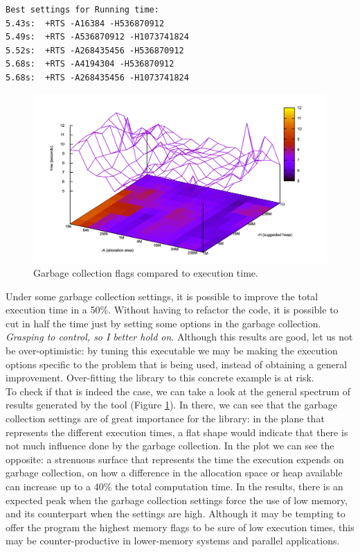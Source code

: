 \begin{lstlisting}
Best settings for Running time:
5.43s:  +RTS -A16384 -H536870912
5.49s:  +RTS -A536870912 -H1073741824
5.52s:  +RTS -A268435456 -H536870912
5.68s:  +RTS -A4194304 -H536870912
5.68s:  +RTS -A268435456 -H1073741824
\end{lstlisting}

\begin{figure}[ht]
\centering
\includegraphics[width=\textwidth]{img/gc-tuning.png}
\caption{Garbage collection flags compared to execution time.}
\label{gc-tuning}
\end{figure}

Under some garbage collection settings, it is possible to improve the total
execution time in a 50\%. Without having to refactor the code, it is possible
to cut in half the time just by setting some options in the garbage collection.
\emph{Grasping to control, so I better hold on}. Although this results are
good, let us not be over-optimistic: by tuning this executable we may be making
the execution options specific to the problem that is being used, instead of
obtaining a general improvement. Over-fitting the
library to this concrete example is at risk.\\

To check if that is indeed the case, we can take a look at the general spectrum
of results generated by the tool (Figure \ref{gc-tuning}). In there, we can see
that the garbage collection settings are of great importance for the library:
in the plane that represents the different execution times, a flat shape would
indicate that there is not much influence done by the garbage collection. In
the plot we can see the opposite: a strenuous surface that represents the time
the execution expends on garbage collection, on how a difference in the
allocation space or heap available can increase up to a 40\% the total
computation time. In the results, there is an expected peak when the garbage
collection settings force the use of low memory, and its counterpart when the
settings are high. Although it may be tempting to offer the program the highest
memory flags to be sure of low execution times, this may be counter-productive
in lower-memory systems and parallel applications.\\


